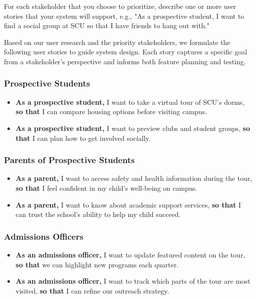 \begin{tcolorbox}[      %
    boxrule=0pt,        %
    colback=white,      %
    coltext=red         %
]                       %
    For each stakeholder that you choose to prioritize, describe one or more user stories that your system will support, e.g., "As a prospective student, I want to find a social group at SCU so that I have friends to hang out with."
    
    Based on our user research and the priority stakeholders, we formulate the following user stories to guide system design. Each story captures a specific goal from a stakeholder's perspective and informs both feature planning and testing.
    
    \subsubsection*{Prospective Students}
    \begin{itemize}
      \item \textbf{As a prospective student,} I want to take a virtual tour of SCU’s dorms, \textbf{so that} I can compare housing options before visiting campus.
      \item \textbf{As a prospective student,} I want to preview clubs and student groups, \textbf{so that} I can plan how to get involved socially.
    \end{itemize}
    
    \subsubsection*{Parents of Prospective Students}
    \begin{itemize}
      \item \textbf{As a parent,} I want to access safety and health information during the tour, \textbf{so that} I feel confident in my child’s well-being on campus.
      \item \textbf{As a parent,} I want to know about academic support services, \textbf{so that} I can trust the school’s ability to help my child succeed.
    \end{itemize}
    
    \subsubsection*{Admissions Officers}
    \begin{itemize}
      \item \textbf{As an admissions officer,} I want to update featured content on the tour, \textbf{so that} we can highlight new programs each quarter.
      \item \textbf{As an admissions officer,} I want to track which parts of the tour are most visited, \textbf{so that} I can refine our outreach strategy.
    \end{itemize}
    

\end{tcolorbox}
